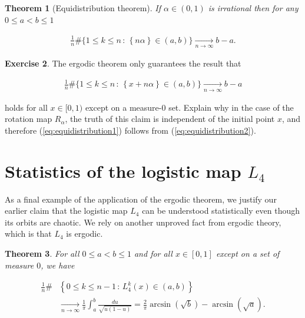 \documentclass[11pt]{report}
\theoremstyle{plain}
\newtheorem{thm}{Theorem}[chapter]
\theoremstyle{definition}
\newtheorem{xexercise}[thm]{Exercise}
\begin{document}
\begin{thm}[Equidistribution theorem]
If $\alpha\in(0,1)$ is irrational then for any
$0\le a<b\le 1$

\begin{equation*} \tag{37}\label{eq:equidistribution1}
\begin{split}
\frac{1}{n} \#\Big\{ 1\le k \le n \,:\, \left\{n\alpha\right\} \in (a,b) \Big\} \xrightarrow[n\to\infty]{} b-a.
\end{split}
\end{equation*}

\end{thm}

\begin{xexercise}
The ergodic theorem only guarantees the result that

\begin{equation*} \tag{38}\label{eq:equidistribution2}
\begin{split}
\frac{1}{n} \#\Big\{ 1\le k \le n \,:\, \left\{x+n\alpha\right\} \in (a,b) \Big\} \xrightarrow[n\to\infty]{} b-a
\end{split}
\end{equation*}

holds for all $x\in [0,1)$ except on a measure-0 set.
Explain why in the case of the rotation map
$R_\alpha$, the truth of this claim is independent of
the initial point $x$, and therefore
(\ref{eq:equidistribution1}) follows from
(\ref{eq:equidistribution2}).
\end{xexercise}

\section{Statistics of the logistic map $L_4$}
As a final example of the application of the ergodic
theorem, we justify our earlier claim that the
logistic map $L_4$ can be understood statistically
even though its orbits are chaotic. We rely on another
unproved fact from ergodic theory, which is that $L_4$
is ergodic.

\begin{thm}
For all $0\le a<b\le 1$ and for all $x\in[0,1]$
except on a set of measure $0$, we have

\begin{align*}
\frac{1}{n}\# &\left\{ 0\le k\le n-1\,:\, L_4^k(x) \in (a,b) \right\} \\
& \xrightarrow[n\to\infty]{} \frac{1}{\pi} \int_a^b \frac{du}{\sqrt{u(1-u)}}
= \frac{2}{\pi}\arcsin(\sqrt{b})-\arcsin(\sqrt{a}).
\end{align*}

\end{thm}
\end{document}
